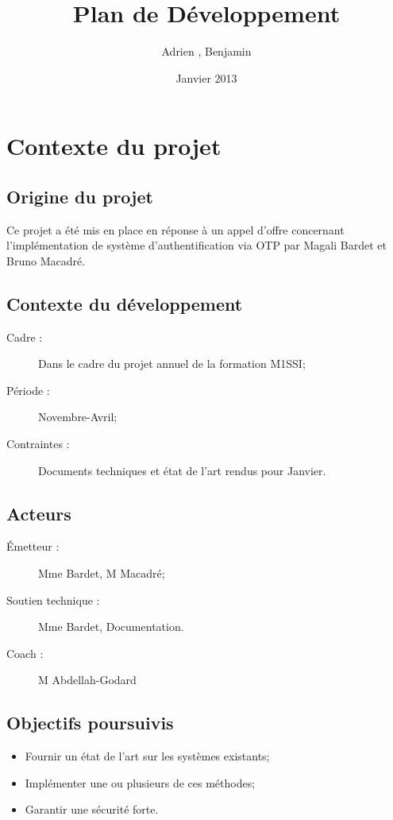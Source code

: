 \documentclass{../../res/univ-projet}
\title{Plan de Développement}
\author{Adrien \bsc{Smondack}, Benjamin \bsc{Zigh}}
\date{Janvier 2013}
\begin{document}
\maketitle

\section{Contexte du projet}
	\subsection{Origine du projet}
	Ce projet a été mis en place en réponse à un appel d'offre concernant 
	l'implémentation de système d'authentification via OTP par Magali Bardet et 
	Bruno Macadré.
	
	\subsection{Contexte du développement}
	\begin{description} 
		\item [Cadre :] Dans le cadre du projet annuel de la formation M1SSI;
		\item [Période :] Novembre-Avril;
		\item [Contraintes :] Documents techniques et état de l'art rendus pour Janvier.
	\end{description}

	\subsection{Acteurs}
	\begin{description}
		\item [Émetteur :] Mme Bardet, M Macadré;
		\item [Soutien technique :] Mme Bardet, Documentation.
		\item [Coach :] M Abdellah-Godard
	\end{description}

	\subsection{Objectifs poursuivis}
	\begin{itemize}
		\item Fournir un état de l'art sur les systèmes existants;
		\item Implémenter une ou plusieurs de ces méthodes;
		\item Garantir une sécurité forte.
	\end{itemize}
\end{document}
